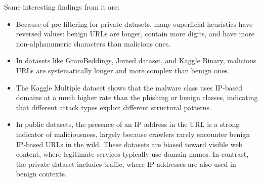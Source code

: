 Some interesting findings from it are:
\begin{itemize}
    \item Because of pre-filtering for private datasets, many superficial heuristics have reversed values: benign URLs are longer, contain more digits, and have more non-alphanumeric characters than malicious ones.
    \item In datasets like GramBeddings, Joined dataset, and Kaggle Binary, malicious URLs are systematically longer and more complex than benign ones.
    \item The Kaggle Multiple dataset shows that the malware class uses IP-based domains at a much higher rate than the phishing or benign classes, indicating that different attack types exploit different structural patterns.
    \item In public datasets, the presence of an IP address in the URL is a strong indicator of maliciousness, largely because crawlers rarely encounter benign IP-based URLs in the wild. These datasets are biased toward visible web content, where legitimate services typically use domain names. In contrast, the private dataset includes traffic, where IP addresses are also used in benign contexts.
\end{itemize}

